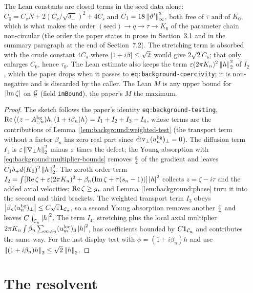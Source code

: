 The Lean constants are closed terms in the seed data alone:
$C_0=C_vN+2(C_v/\sqrt{\delta_-})^2+4C_s$ and $C_1=18\left\|\vartheta'\right\|_\infty^2$, both free
of $\tau$ and of $K_0$, which is what makes the order
$(\text{seed})\to q\to\tau\to K_0$ of the parameter chain non-circular (the order the
paper states in prose in Section~3.1 and in the summary paragraph at the end of Section~7.2).  The
stretching term is absorbed with the crude constant $4C_s$ where
$\left\lvert1+i\beta\right\rvert\leq\sqrt2$ would give $2\sqrt2C_s$; that only enlarges $C_0$, hence
$\tau_0$.  The Lean estimate also keeps the term $\varepsilon(2\pi K_n)^2\left\|h\right\|_2^2$ of $I_2$,
which the paper drops when it passes to \texttt{eq:background-coercivity}; it is
non-negative and is discarded by the caller.  The Lean $M$ is any upper bound for
$\left\lvert\operatorname{Im}\zeta\right\rvert$ on $\mathcal{G}$ (field \texttt{imBound}), the paper's $M$ the maximum.

\begin{proof}
  \leanok
  The sketch follows the paper's identity \texttt{eq:background-testing},
  $\operatorname{Re}\left\langle(z-A^{\rm bg}_{\varepsilon,n})h,(1+i\beta_n)h\right\rangle=I_1+I_2+I_3+I_4$, whose terms are the
  contributions of Lemma~\ref{lem:background:weighted-test} (the transport term without a
  factor $\beta_n$ has zero real part since $\operatorname{div}_\perp(u_n^{\rm bg})_\perp=0$).  The
  diffusion term $I_1$ is $\varepsilon\left\|\nabla_\perp h\right\|_2^2$ minus $\varepsilon$ times the defect; the
  Young absorption with \eqref{eq:background:multiplier-bounds} removes $\tfrac{\varepsilon}4$ of the
  gradient and leaves $C_1\delta_+d(K_0)^2\left\|h\right\|_2^2$.  The zeroth-order term
  $I_2=\int[\operatorname{Re}\zeta+\varepsilon(2\pi K_n)^2+\beta_n(\operatorname{Im}\zeta+\tau(s_n-1))]\left\lvert h\right\rvert^2$ collects
  $z=\zeta-i\tau$ and the added axial velocities; $\operatorname{Re}\zeta\geq g_*$ and
  Lemma~\ref{lem:background:phase} turn it into the second and third brackets.  The weighted
  transport term $I_3$ obeys $\left\lvert\beta_n(u_n^{\rm bg})_\perp\right\rvert\leq C\sqrt{\varepsilon}\mathbf{1}_{\mathcal C_n}$,
  so a second Young absorption removes another $\tfrac{\varepsilon}4$ and leaves
  $C\int_{\mathcal C_n}\left\lvert h\right\rvert^2$.  The term $I_4$, stretching plus the local axial multiplier
  $2\pi K_n\int\beta_n\sum_{m\neq n}(u_m^{\rm loc})_3\left\lvert h\right\rvert^2$, has coefficients bounded by
  $C\mathbf{1}_{\mathcal C_n}$ and contributes the same way.  For the last display test with
  $\phi=(1+i\beta_n)h$ and use $\left\|(1+i\beta_n)h\right\|_2\leq\sqrt2\left\|h\right\|_2$.
\end{proof}

\section{The resolvent}

